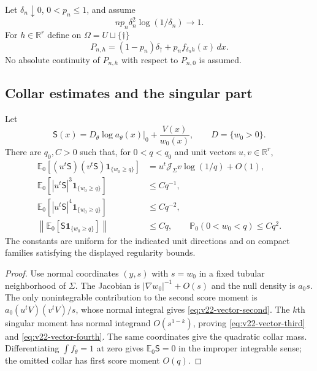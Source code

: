 Let $\delta_n\downarrow0$, $0<p_n\le1$, and assume
\begin{equation}\label{eq:v22-vector-rate}
 n p_n\delta_n^2\log(1/\delta_n)\longrightarrow1.
\end{equation}
For $h\in\mathbb R^r$ define on
$\Omega=U\sqcup\{\dagger\}$
\begin{equation}\label{eq:v22-thinned-family}
 P_{n,h}=(1-p_n)\delta_\dagger+p_nf_{\delta_nh}(x)\,dx.
\end{equation}
No absolute continuity of $P_{n,h}$ with respect to $P_{n,0}$ is assumed.

\subsection{Collar estimates and the singular part}

\begin{lemma}
\label{lem:v22-vector-collar}
Let
\[
 \mathsf S(x)=D_\theta\log a_\theta(x)|_0+\frac{V(x)}{w_0(x)},
 \qquad D=\{w_0>0\}.
\]
There are $q_0,C>0$ such that, for $0<q<q_0$ and unit vectors
$u,v\in\mathbb R^r$,
\begin{align}
 \mathbb E_0[(u^t\mathsf S)(v^t\mathsf S)
       \mathbf1_{\{w_0\ge q\}}]
 &=u^t\mathcal J_\Sigma v\log(1/q)+O(1),
                                      \label{eq:v22-vector-second}\\
 \mathbb E_0[|u^t\mathsf S|^3\mathbf1_{\{w_0\ge q\}}]
 &\le Cq^{-1},                       \label{eq:v22-vector-third}\\
 \mathbb E_0[|u^t\mathsf S|^4\mathbf1_{\{w_0\ge q\}}]
 &\le Cq^{-2},                       \label{eq:v22-vector-fourth}\\
 \left\|\mathbb E_0[\mathsf S\mathbf1_{\{w_0\ge q\}}]\right\|
 &\le Cq,
 \qquad
 \mathbb P_0(0<w_0<q)\le Cq^2.      \label{eq:v22-vector-centering}
\end{align}
The constants are uniform for the indicated unit directions and on compact
families satisfying the displayed regularity bounds.
\end{lemma}

\begin{proof}
Use normal coordinates $(y,s)$ with $s=w_0$ in a fixed tubular neighborhood
of $\Sigma$.  The Jacobian is $|\nabla w_0|^{-1}+O(s)$ and the null density
is $a_0s$.  The only nonintegrable contribution to the second score moment is
$a_0(u^tV)(v^tV)/s$, whose normal integral gives
\eqref{eq:v22-vector-second}.  The $k$th singular moment has normal integrand
$O(s^{1-k})$, proving \eqref{eq:v22-vector-third} and
\eqref{eq:v22-vector-fourth}.  The same coordinates give the quadratic collar
mass.  Differentiating $\int f_\theta=1$ at zero gives
$\mathbb E_0\mathsf S=0$ in the improper integrable sense; the omitted collar
has first score moment $O(q)$.
\end{proof}


